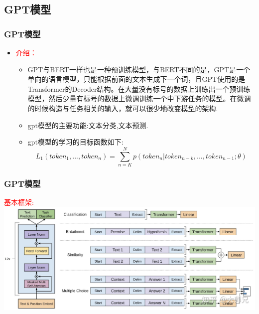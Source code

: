 \documentclass[t]{beamer}
\begin{document}
\begin{CJK*}{UTF8}{gkai}
\section{GPT模型}

\begin{frame}
	\frametitle{GPT模型}
    \begin{itemize}
		\item
		\textcolor{red}{介绍：}
		\begin{itemize}
		\item 
		GPT与BERT一样也是一种预训练模型，与BERT不同的是，GPT是一个单向的语言模型，只能根据前面的文本生成下一个词，且GPT使用的是Transformer的Decoder结构。在大量没有标号的数据上训练出一个预训练模型，然后少量有标号的数据上微调训练一个中下游任务的模型。在微调的时候构造与任务相关的输入，就可以很少地改变模型的架构.
		\item gpt模型的主要功能:文本分类,文本预测.
		\item gpt模型的学习的目标函数如下:\\
	$$
    L_1(token_1,...,token_n) = \sum^{N}_{n=K}p(token_n|token_{n-k},...,token_{n-1};\theta)
	$$
		\end{itemize}
	\end{itemize}
\end{frame}

\begin{frame}
	\frametitle{GPT模型}
	\textcolor{red}{	基本框架:}\\
	\includegraphics[scale=0.12]{png/gpt.jpg}
\end{frame}



\end{CJK*}
\end{document}
